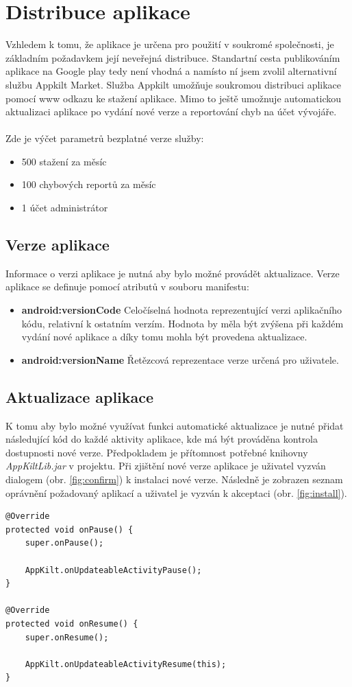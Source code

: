 \documentclass{diplomka}
\begin{document}
\section{Distribuce aplikace}
Vzhledem k tomu, že aplikace je určena pro použití v soukromé společnosti, je základním požadavkem její neveřejná distribuce. Standartní cesta publikováním aplikace na Google play tedy není vhodná a namísto ní jsem zvolil alternativní službu Appkilt Market\cite{appkilt}. Služba Appkilt umožňuje soukromou distribuci aplikace pomocí www odkazu ke stažení aplikace. Mimo to ještě umožnuje automatickou aktualizaci aplikace po vydání nové verze a reportování chyb na účet vývojáře. \\ \\Zde je výčet parametrů bezplatné verze služby:
\begin{itemize}[noitemsep,nolistsep]
\item 500 stažení za měsíc
\item 100 chybových reportů za měsíc
\item 1 účet administrátor
\end{itemize}

\subsection*{Verze aplikace}
Informace o verzi aplikace je nutná aby bylo možné provádět aktualizace. Verze aplikace se definuje pomocí atributů v souboru manifestu:
\begin{itemize}[noitemsep,nolistsep]
\item \textbf{android:versionCode}
Celočíselná hodnota reprezentující verzi aplikačního kódu, relativní k ostatním verzím. Hodnota by měla být zvýšena při každém vydání nové aplikace a díky tomu mohla být provedena aktualizace.
\item \textbf{android:versionName}
Řetězcová reprezentace verze určená pro uživatele. 
\end{itemize}

\subsection*{Aktualizace aplikace}
K tomu aby bylo možné využívat funkci automatické aktualizace je nutné přidat následující kód do každé aktivity aplikace, kde má být prováděna kontrola dostupnosti nové verze. Předpokladem je přítomnost potřebné knihovny \emph{AppKiltLib.jar} v projektu. Při zjištění nové verze aplikace je uživatel vyzván dialogem (obr. \ref{fig:confirm}) k instalaci nové verze. Následně je zobrazen seznam oprávnění požadovaný aplikací a uživatel je vyzván k akceptaci (obr. \ref{fig:install}).
\begin{lstlisting}
@Override
protected void onPause() { 
	super.onPause();

	AppKilt.onUpdateableActivityPause();
}

@Override
protected void onResume() {
	super.onResume();
	
	AppKilt.onUpdateableActivityResume(this);
}
\end{lstlisting}
\end{document}
